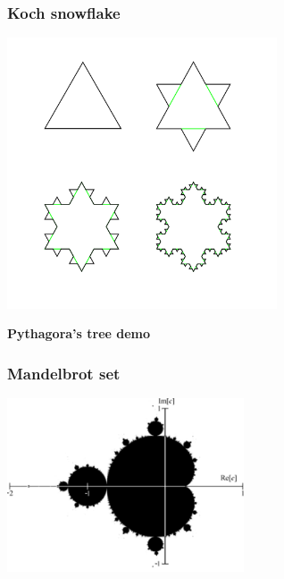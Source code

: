 \documentclass[9pt]{beamer}
\begin{document}
\begin{frame}
  \frametitle{Koch snowflake}

  \begin{center}
    \includegraphics[width = 8cm]{images/koch_building.png}
  \end{center}


\end{frame}



\begin{frame}
  \begin{center}
    {\Huge \bf{Pythagora's tree demo}}
  \end{center}
\end{frame}

\begin{frame}
  \frametitle{Mandelbrot set}

  \begin{center}
    \includegraphics[width = 7cm]{images/mandelbrot_simple.png}
  \end{center}
\end{frame}
\end{document}
